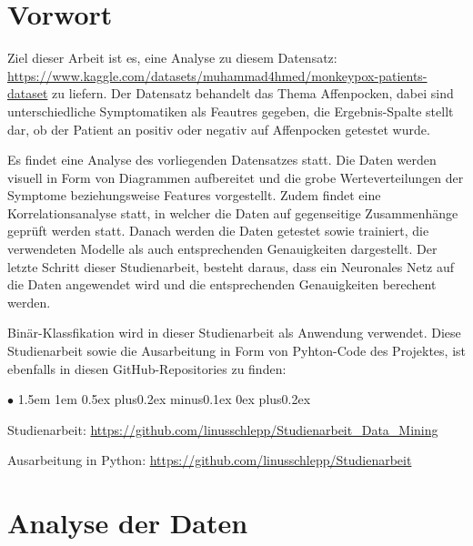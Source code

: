 \documentclass[13pt,a4paper, listof=entryprefix, bibliography=totocnumbered,toc=listofnumbered,lof=listofnumbered]{scrartcl}
\newenvironment{FHitemize}{\begin{list}{$\bullet$} {\leftmargin1.5em \labelsep1em \rightmargin0cm \parsep0.5ex plus0.2ex minus0.1ex \itemsep0ex plus0.2ex}}{\end{list}}
\begin{document}

	\section{Vorwort}
		\label{ch:vorwort}

Ziel dieser Arbeit ist es, eine Analyse zu diesem Datensatz: \linebreak \url{https://www.kaggle.com/datasets/muhammad4hmed/monkeypox-patients-dataset}  
zu liefern. Der Datensatz behandelt das Thema Affenpocken, dabei sind unterschiedliche Symptomatiken als Feautres gegeben, die Ergebnis-Spalte stellt dar, ob 
der Patient an positiv oder negativ auf Affenpocken getestet wurde.

Es findet eine Analyse des vorliegenden Datensatzes statt.  Die Daten werden visuell in Form von Diagrammen aufbereitet und die grobe Werteverteilungen
der Symptome beziehungsweise Features vorgestellt. Zudem findet eine Korrelationsanalyse statt, in welcher die 
Daten auf gegenseitige Zusammenhänge geprüft werden statt. Danach werden die Daten getestet sowie trainiert, die
verwendeten Modelle als auch entsprechenden Genauigkeiten dargestellt. Der letzte Schritt dieser Studienarbeit,
besteht daraus, dass ein Neuronales Netz auf die Daten angewendet wird und die entsprechenden Genauigkeiten
berechent werden. 

Binär-Klassfikation wird in dieser Studienarbeit als Anwendung verwendet. Diese Studienarbeit sowie die Ausarbeitung in Form von Pyhton-Code 
des Projektes, ist ebenfalls in diesen GitHub-Repositories zu finden:

	\begin{FHitemize}
		\item Studienarbeit: \url{https://github.com/linusschlepp/Studienarbeit_Data_Mining}
		\item Ausarbeitung in Python: \url{https://github.com/linusschlepp/Studienarbeit}
	\end{FHitemize}
	

	\section{Analyse der Daten}
		\label{ch:analyse_daten}
\end{document}
